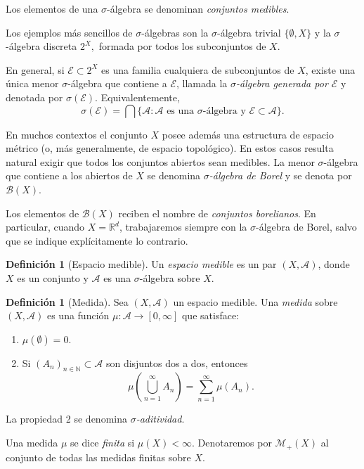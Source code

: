 \documentclass[12pt, a4paper]{amsbook}
\theoremstyle{remark}
\theoremstyle{definition}
\newtheorem{defi}[teo]{Definición}
\numberwithin{section}{chapter}
\numberwithin{subsection}{section}
\numberwithin{equation}{section}
\numberwithin{figure}{chapter}
\begin{document}
Los elementos de una \(\sigma\)-álgebra se denominan \emph{conjuntos medibles}.

Los ejemplos más sencillos de \(\sigma\)-álgebras son la \(\sigma\)-álgebra trivial
\(
\{\emptyset,X\}
\)
y la \(\sigma\)-álgebra discreta
\(
2^X,
\)
formada por todos los subconjuntos de \(X\).

En general, si \(\mathcal E\subset 2^X\) es una familia cualquiera de subconjuntos de \(X\), existe una única menor \(\sigma\)-álgebra que contiene a \(\mathcal E\), llamada la \emph{\(\sigma\)-álgebra generada por \(\mathcal E\)} y denotada por
\(
\sigma(\mathcal E).
\)
Equivalentemente,
\[
\sigma(\mathcal E)
=
\bigcap\{\mathcal A:\mathcal A\text{ es una }\sigma\text{-álgebra y }\mathcal E\subset\mathcal A\}.
\]

En muchos contextos el conjunto \(X\) posee además una estructura de espacio métrico (o, más generalmente, de espacio topológico). En estos casos resulta natural exigir que todos los conjuntos abiertos sean medibles. La menor \(\sigma\)-álgebra que contiene a los abiertos de \(X\) se denomina \emph{\(\sigma\)-álgebra de Borel} y se denota por
\(
\mathcal B(X).
\)

Los elementos de \(\mathcal B(X)\) reciben el nombre de \emph{conjuntos borelianos}. En particular, cuando \(X=\mathbb{R}^d\), trabajaremos siempre con la \(\sigma\)-álgebra de Borel, salvo que se indique explícitamente lo contrario.

\begin{defi}[Espacio medible]
Un \emph{espacio medible} es un par \((X,\mathcal A)\), donde \(X\) es un conjunto y \(\mathcal A\) es una \(\sigma\)-álgebra sobre \(X\).
\end{defi}

\begin{defi}[Medida]
Sea \((X,\mathcal A)\) un espacio medible. Una \emph{medida} sobre \((X,\mathcal A)\) es una función
\(
\mu\colon\mathcal A\to[0,\infty]
\)
que satisface:
\begin{enumerate}
    \item \(\mu(\emptyset)=0\).
    \item Si \((A_n)_{n\in\mathbb N}\subset\mathcal A\) son disjuntos dos a dos, entonces
    \[
    \mu\left(\bigcup_{n=1}^{\infty}A_n\right)
    =
    \sum_{n=1}^{\infty}\mu(A_n).
    \]
\end{enumerate}
La propiedad 2 se denomina \emph{\(\sigma\)-aditividad}.
\end{defi}

Una medida \(\mu\) se dice \emph{finita} si \(\mu(X)<\infty\).  Denotaremos por
\(
\mathcal M_+(X)
\)
al conjunto de todas las medidas finitas sobre \(X\).
\end{document}
